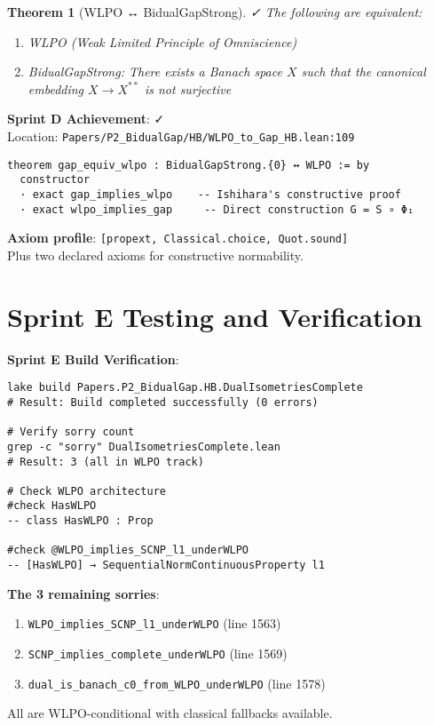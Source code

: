 \documentclass[11pt]{article}
\newtheorem{theorem}{Theorem}[section]
\theoremstyle{definition}
\theoremstyle{remark}
\newcommand{\leanok}{\textcolor{green!70!black}{✓}}
\newcommand{\leanloc}[1]{\texttt{\footnotesize\color{blue!60!black}#1}}
\newcommand{\sprintE}{\textcolor{orange!70!black}{\textbf{Sprint E}}}
\begin{document}
\begin{theorem}[WLPO ↔ BidualGapStrong]\label{thm:wlpo-gap} \leanok
The following are equivalent:
\begin{enumerate}
\item WLPO (Weak Limited Principle of Omniscience)
\item BidualGapStrong: There exists a Banach space \(X\) such that the canonical embedding \(X \to X^{**}\) is not surjective
\end{enumerate}
\end{theorem}

\begin{mdframed}[style=okbox]
\textbf{Sprint D Achievement}: \leanok\\
Location: \leanloc{Papers/P2\_BidualGap/HB/WLPO\_to\_Gap\_HB.lean:109}\\
\begin{verbatim}
theorem gap_equiv_wlpo : BidualGapStrong.{0} ↔ WLPO := by
  constructor
  · exact gap_implies_wlpo    -- Ishihara's constructive proof
  · exact wlpo_implies_gap     -- Direct construction G = S ∘ Φ₁
\end{verbatim}
\textbf{Axiom profile}: \texttt{[propext, Classical.choice, Quot.sound]}\\
Plus two declared axioms for constructive normability.
\end{mdframed}

\section{Sprint E Testing and Verification}\label{sec:testing}

\begin{mdframed}[style=okbox]
\textbf{\sprintE{} Build Verification}:
\begin{verbatim}
lake build Papers.P2_BidualGap.HB.DualIsometriesComplete
# Result: Build completed successfully (0 errors)

# Verify sorry count
grep -c "sorry" DualIsometriesComplete.lean
# Result: 3 (all in WLPO track)

# Check WLPO architecture
#check HasWLPO
-- class HasWLPO : Prop

#check @WLPO_implies_SCNP_l1_underWLPO
-- [HasWLPO] → SequentialNormContinuousProperty l1
\end{verbatim}

\textbf{The 3 remaining sorries}:
\begin{enumerate}
\item \texttt{WLPO\_implies\_SCNP\_l1\_underWLPO} (line 1563)
\item \texttt{SCNP\_implies\_complete\_underWLPO} (line 1569)  
\item \texttt{dual\_is\_banach\_c0\_from\_WLPO\_underWLPO} (line 1578)
\end{enumerate}
All are WLPO-conditional with classical fallbacks available.
\end{mdframed}
\end{document}
